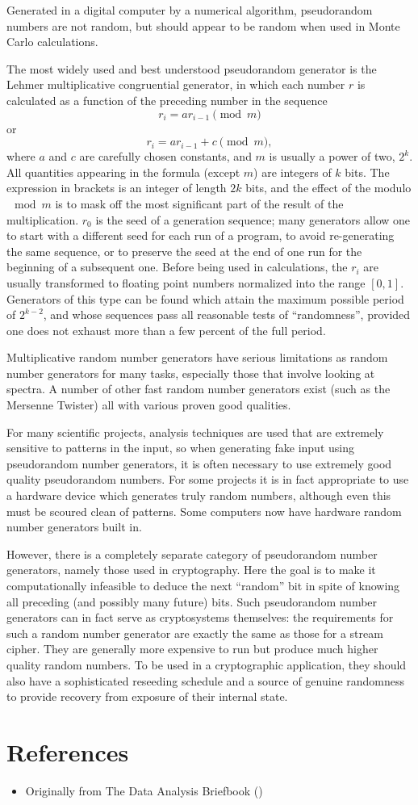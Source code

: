 \documentclass[12pt]{article}
\begin{document}
Generated in a digital computer by a numerical algorithm, pseudorandom numbers are not random, but should appear to be random when used in Monte Carlo calculations.

The most widely used and best understood pseudorandom generator is the Lehmer multiplicative congruential generator, in which each number $r$ is calculated as a function of the preceding number in the sequence
\[
r_i = a r_{i-1}  \pmod{m}
\]
or
\[
r_i = a r_{i-1} + c  \pmod{m},
\]
where $a$ and $c$ are carefully chosen constants, and $m$ is usually a power of two, $2^k$. All quantities appearing in the formula (except $m$) are integers of $k$ bits. The expression in brackets is an integer of length $2k$ bits, and the effect of the modulo $\mod m$ is to mask off the most significant part of the result of the multiplication. $r_0$ is the seed of a generation sequence; many generators allow one to start with a different seed for each run of a program, to avoid re-generating the same sequence, or to preserve the seed at the end of one run for the beginning of a subsequent one. Before being used in calculations, the $r_i$ are usually transformed to floating point numbers normalized into the range $[0,1]$. Generators of this type can be found which attain the maximum possible period of $2^{k-2}$, and whose sequences pass all reasonable tests of ``randomness'', provided one does not exhaust more than a few percent of the full period.

Multiplicative random number generators have serious limitations as random number generators for many tasks, especially those that involve looking at spectra.  A number of other fast random number generators exist (such as the Mersenne Twister) all with various proven good qualities.

For many scientific projects, analysis techniques are used that are extremely sensitive to patterns in the input, so when generating fake input using pseudorandom number generators, it is often necessary to use extremely good quality pseudorandom numbers.  For some projects it is in fact appropriate to use a hardware device which generates truly random numbers, although even this must be scoured clean of patterns.  Some computers now have hardware random number generators built in.

However, there is a completely separate category of pseudorandom number generators, namely those used in cryptography.  Here the goal is to make it computationally infeasible to deduce the next ``random'' bit in spite of knowing all preceding (and possibly many future) bits.  Such pseudorandom number generators can in fact serve as cryptosystems themselves: the requirements for such a random number generator are exactly the same as those for a stream cipher.  They are generally more expensive to run but produce much higher quality random numbers.  To be used in a cryptographic application, they should also have a sophisticated reseeding schedule and a source of genuine randomness to provide recovery from exposure of their internal state.

\section*{References}

\begin{itemize}
\item Originally from The Data Analysis Briefbook
()
\end{itemize}
\end{document}
